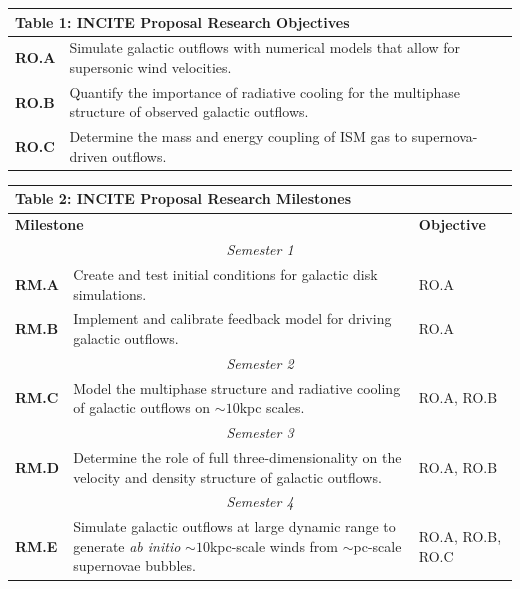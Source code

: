 \documentclass[11pt,letterpaper,english]{article}
\begin{document}
\begin{table}[h]
\vspace{-.12in}
\begin{tabular}{|l|l|} 
\multicolumn{2}{l}{\bf{Table 1: INCITE Proposal Research Objectives}}\\
\hline
\textbf{RO.A} & Simulate galactic outflows with numerical models that allow for supersonic
wind velocities. \\ \hline
\textbf{RO.B} & Quantify the importance of radiative cooling 
for the multiphase structure of observed galactic outflows.\\ \hline
\textbf{RO.C} & Determine the mass and energy coupling of ISM gas to supernova-driven outflows.\\
\hline
\end{tabular}
\end{table}


\begin{table}[h]
\vspace{-.12in}
\begin{tabular}{|l|p{4.6in}|l|} 
\multicolumn{3}{l}{\bf{Table 2: INCITE Proposal Research Milestones}}\\
\hline
\multicolumn{2}{|l|}{\bf Milestone} & {\bf Objective} \\ \hline
\multicolumn{3}{|c|}{\it Semester 1} \\ \hline
\textbf{RM.A} & Create and test initial conditions for galactic disk simulations. & RO.A \\ \hline
\textbf{RM.B} & Implement and calibrate feedback model for driving galactic outflows. & RO.A\\ \hline
\multicolumn{3}{|c|}{\it Semester 2} \\ \hline
\textbf{RM.C} & Model the multiphase structure and radiative cooling of galactic
outflows on $\sim10$kpc scales. & RO.A, RO.B \\ \hline
\multicolumn{3}{|c|}{\it Semester 3} \\ \hline
\textbf{RM.D} & Determine the role of full three-dimensionality on the velocity and density
structure of galactic outflows. & RO.A, RO.B\\ \hline
\multicolumn{3}{|c|}{\it Semester 4} \\ \hline
\textbf{RM.E} & Simulate galactic outflows at large dynamic range to generate {\it ab initio} $\sim10$kpc-scale winds from $\sim$pc-scale supernovae bubbles. & RO.A, RO.B, RO.C\\ 
\hline
\end{tabular}
\end{table}
\end{document}
